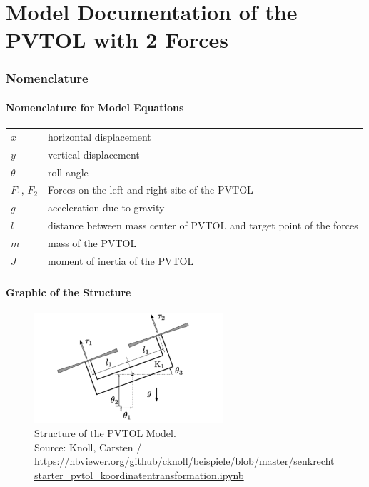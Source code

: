 \documentclass[10pt,a4paper]{article}
\begin{document}
	\part*{Model Documentation of the \\PVTOL with 2 Forces} %
	
	
	\section{Nomenclature} %
	\subsection{Nomenclature for Model Equations} %
	
	\begin{tabular}{ll}
		$x$ & horizontal displacement \\
		$y$ & vertical displacement \\
		$\theta$ & roll angle \\
		$F_1$, $F_2$ & Forces on the left and right site of the PVTOL \\
		$g$ & acceleration due to gravity \\
		$l$ & distance between mass center of PVTOL and target point of the forces \\
		$m$ & mass of the PVTOL \\
		$J$ & moment of inertia of the PVTOL		
	\end{tabular}


	\subsection{Graphic of the Structure}	
	\begin{figure}[H]
		\centering
		\captionsetup{justification=centering, margin=1cm}
		\includegraphics[width=70mm]{pvtol.pdf}
		\caption{Structure of the PVTOL Model. \\ 
		\footnotesize{Source: Knoll, Carsten / \protect\url{https://nbviewer.org/github/cknoll/beispiele/blob/master/senkrechtstarter_pvtol_koordinatentransformation.ipynb}}}
	\end{figure}
	
\end{document}
